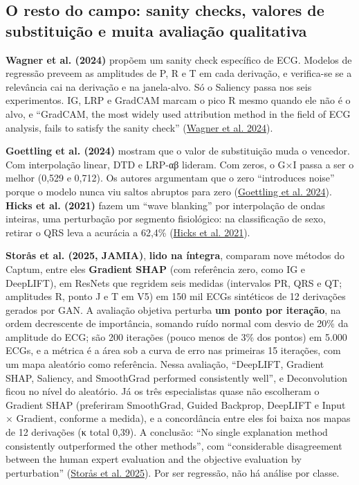 \documentclass[11pt,a4paper]{article}
\begin{document}
\subsection{O resto do campo: sanity checks, valores de substituição e muita avaliação qualitativa}

\textbf{Wagner et al. (2024)} propõem um sanity check específico de ECG. Modelos de regressão preveem as amplitudes de P, R e T em cada derivação, e verifica-se se a relevância cai na derivação e na janela-alvo. Só o Saliency passa nos seis experimentos. IG, LRP e GradCAM marcam o pico R mesmo quando ele não é o alvo, e ``GradCAM, the most widely used attribution method in the field of ECG analysis, fails to satisfy the sanity check'' (\href{https://arxiv.org/html/2305.17043v2}{Wagner et al. 2024}).

\textbf{Goettling et al. (2024)} mostram que o valor de substituição muda o vencedor. Com interpolação linear, DTD e LRP-αβ lideram. Com zeros, o G×I passa a ser o melhor (0,529 e 0,712). Os autores argumentam que o zero ``introduces noise'' porque o modelo nunca viu saltos abruptos para zero (\href{https://pmc.ncbi.nlm.nih.gov/articles/PMC11161651/}{Goettling et al. 2024}). \textbf{Hicks et al. (2021)} fazem um ``wave blanking'' por interpolação de ondas inteiras, uma perturbação por segmento fisiológico: na classificação de sexo, retirar o QRS leva a acurácia a 62,4\% (\href{https://pmc.ncbi.nlm.nih.gov/articles/PMC8154909/}{Hicks et al. 2021}).

\textbf{Storås et al. (2025, JAMIA)}, \textbf{lido na íntegra}, comparam nove métodos do Captum, entre eles \textbf{Gradient SHAP} (com referência zero, como IG e DeepLIFT), em ResNets que regridem seis medidas (intervalos PR, QRS e QT; amplitudes R, ponto J e T em V5) em 150 mil ECGs sintéticos de 12 derivações gerados por GAN. A avaliação objetiva perturba \textbf{um ponto por iteração}, na ordem decrescente de importância, somando ruído normal com desvio de 20\% da amplitude do ECG; são 200 iterações (pouco menos de 3\% dos pontos) em 5.000 ECGs, e a métrica é a área sob a curva de erro nas primeiras 15 iterações, com um mapa aleatório como referência. Nessa avaliação, ``DeepLIFT, Gradient SHAP, Saliency, and SmoothGrad performed consistently well'', e Deconvolution ficou no nível do aleatório. Já os três especialistas quase não escolheram o Gradient SHAP (preferiram SmoothGrad, Guided Backprop, DeepLIFT e Input × Gradient, conforme a medida), e a concordância entre eles foi baixa nos mapas de 12 derivações (κ total 0,39). A conclusão: ``No single explanation method consistently outperformed the other methods'', com ``considerable disagreement between the human expert evaluation and the objective evaluation by perturbation'' (\href{https://doi.org/10.1093/jamia/ocae280}{Storås et al. 2025}). Por ser regressão, não há análise por classe.
\end{document}

